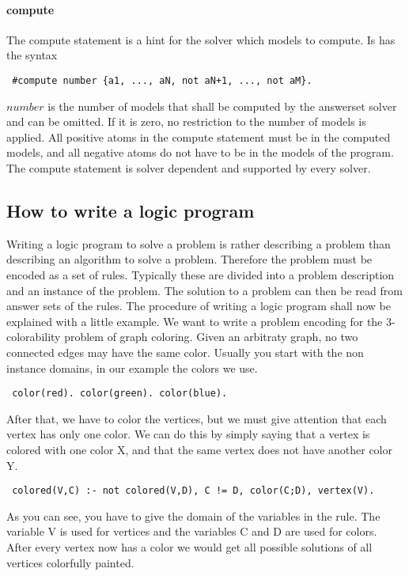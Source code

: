 \documentclass[a4paper,10pt]{article}
\begin{document}
\paragraph{compute}
The compute statement is a hint for the solver which models to compute.
Is has the syntax
\begin{verbatim}
 #compute number {a1, ..., aN, not aN+1, ..., not aM}.
\end{verbatim}
$number$ is the number of models that shall be computed by the answerset solver and can be omitted. If it is zero, no restriction to the number of models is applied.
All positive atoms in the compute statement must be in the computed models, and all negative atoms do not have to be in the models of the program.
The compute statement is solver dependent and supported by every solver.

\subsection{How to write a logic program}
Writing a logic program to solve a problem is rather describing a problem than describing an algorithm to solve a problem.
Therefore the problem must be encoded as a set of rules.
Typically these are divided into a problem description and an instance of the problem.
The solution to a problem can then be read from answer sets of the rules.
The procedure of writing a logic program shall now be explained with a little example.
We want to write a problem encoding for the 3-colorability problem of graph coloring.
Given an arbitraty graph, no two connected edges may have the same color.
\newline
Usually you start with the non instance domains, in our example the colors we use.
\begin{verbatim}
 color(red). color(green). color(blue).
\end{verbatim}
After that, we have to color the vertices, but we must give attention that each vertex has only one color.
We can do this by simply saying that a vertex is colored with one color X, and that the same vertex does not have another color Y.
\begin{verbatim}
 colored(V,C) :- not colored(V,D), C != D, color(C;D), vertex(V).
\end{verbatim}
As you can see, you have to give the domain of the variables in the rule.
The variable V is used for vertices and the variables C and D are used for colors.
After every vertex now has a color we would get all possible solutions of all vertices colorfully painted.
\end{document}
